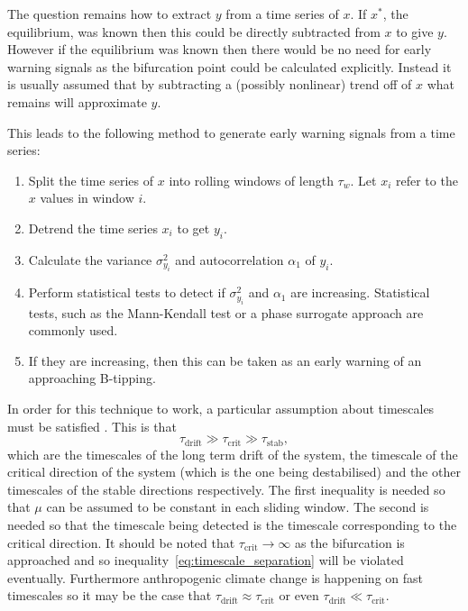 The question remains how to extract $y$ from a time series of $x$. If $x^*$, the equilibrium, was known then this could be directly subtracted from $x$ to give $y$. However if the equilibrium was known
then there would be no need for early warning signals as the bifurcation point could be calculated explicitly. Instead it is usually assumed that by subtracting a (possibly nonlinear) trend
off of $x$ what remains will approximate $y$.

This leads to the following method to generate early warning signals from a time series:
\begin{enumerate}
\item Split the time series of $x$ into rolling windows of length $\tau_w$. Let $x_i$ refer to the $x$ values in window $i$.
\item Detrend the time series $x_i$ to get $y_i$.
\item Calculate the variance $\sigma^2_{y_i}$ and autocorrelation $\alpha_{1}$ of $y_i$.
\item Perform statistical tests to detect if $\sigma^2_{y_i}$ and  $\alpha_{1}$ are increasing. Statistical tests, such as the Mann-Kendall test \parencite{Wilks2019} or a phase
  surrogate approach \parencite{Boettner2022} are commonly used.
\item If they are increasing, then this can be taken as an early warning of an approaching B-tipping. 
\end{enumerate}

In order for this technique to work, a particular assumption about timescales must be satisfied \parencite{Thompson2011b}. This is that
\begin{equation}
  \label{eq:timescale_separation}
  \tau_{\mathrm{drift}} \gg \tau_{\mathrm{crit}} \gg \tau_{\mathrm{stab}},
\end{equation}
which are the timescales of the long term drift of the system, the timescale of the critical direction of the system (which is the one being destabilised) and the other timescales of the stable directions
respectively. The first inequality is needed so that $\mu$ can be assumed to be constant in each sliding window. The second is needed so that the timescale being detected is the timescale corresponding
to the critical direction. It should be noted that $\tau_{\mathrm{crit}} \rightarrow \infty$ as the bifurcation is approached and so inequality~\ref{eq:timescale_separation}
will be violated eventually. Furthermore anthropogenic climate change is happening on fast
timescales so it may be the case that $\tau_{\mathrm{drift}} \approx \tau_{\mathrm{crit}}$ or even $\tau_{\mathrm{drift}} \ll \tau_{\mathrm{crit}}$.

